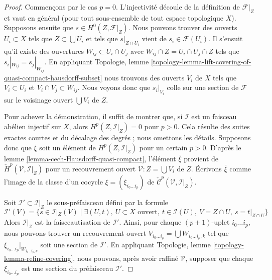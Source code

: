 \begin{proof}

Commençons par le cas $p = 0$. L'injectivité découle de la définition de $\mathcal{F}|_Z$ et vaut en général (pour tout sous-ensemble de tout espace topologique $X$). Supposons ensuite que
$s \in H^0(Z, \mathcal{F}|_Z)$. Nous pouvons trouver des ouverts $U_i \subset X$
tels que $Z \subset \bigcup U_i$ et tels que $s|_{Z \cap U_i}$
vient de $s_i \in \mathcal{F}(U_i)$. Il s'ensuit qu'il existe des ouvertures $W_{ij} \subset U_i \cap U_j$ avec
$W_{ij} \cap Z = U_i \cap U_j \cap Z$ tels que
$s_i|_{W_{ij}} = s_j|_{W_{ij}}$. En appliquant Topologie, lemme
\ref{topology-lemma-lift-covering-of-quasi-compact-hausdorff-subset}
nous trouvons des ouverts $V_i$ de $X$ tels que $V_i \subset U_i$ et $V_i \cap V_j \subset W_{ij}$. Nous voyons donc que
$s_i|_{V_i}$ colle sur une section de $\mathcal{F}$ sur le voisinage ouvert $\bigcup V_i$ de $Z$.

\medskip\noindent
Pour achever la démonstration, il suffit de montrer que, si $\mathcal{I}$ est un faisceau abélien injectif sur $X$, alors $H^p(Z, \mathcal{I}|_Z) = 0$ pour $p > 0$. Cela résulte des suites exactes courtes et du décalage des degrés ; nous omettons les détails. Supposons donc que $\overline{\xi}$ soit un élément de $H^p(Z, \mathcal{I}|_Z)$ pour un certain $p > 0$. D'après le lemme \ref{lemma-cech-Hausdorff-quasi-compact}, l'élément $\overline{\xi}$ provient de $\check{H}^p(\mathcal{V}, \mathcal{I}|_Z)$ pour un recouvrement ouvert $\mathcal{V} : Z = \bigcup V_i$ de $Z$. Écrivons $\overline{\xi}$ comme l'image de la classe d'un cocycle $\xi = (\xi_{i_0 \ldots i_p})$ de $\check{\mathcal{C}}^p(\mathcal{V}, \mathcal{I}|_Z)$.

\medskip\noindent
Soit $\mathcal{I}' \subset \mathcal{I}|_Z$ le sous-préfaisceau défini par la formule $$
\mathcal{I}'(V) =
\{s \in \mathcal{I}|_Z(V) \mid
\exists (U, t),\ U \subset X\text{ ouvert},
\ t \in \mathcal{I}(U),\ V = Z \cap U,\ s = t|_{Z \cap U} \}
$$ Alors $\mathcal{I}|_Z$ est la faisceautisation de $\mathcal{I}'$. Ainsi, pour chaque $(p + 1)$-uplet $i_0 \ldots i_p$, nous pouvons trouver un recouvrement ouvert $V_{i_0 \ldots i_p} = \bigcup W_{i_0 \ldots i_p, k}$ tel que $\xi_{i_0 \ldots i_p}|_{W_{i_0 \ldots i_p, k}}$ soit une section de $\mathcal{I}'$. En appliquant Topologie, lemme \ref{topology-lemma-refine-covering}, nous pouvons, après avoir raffiné $\mathcal{V}$, supposer que chaque $\xi_{i_0 \ldots i_p}$ est une section du préfaisceau $\mathcal{I}'$.

\medskip\noindent


\end{proof}
